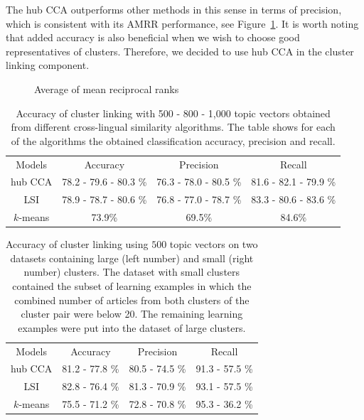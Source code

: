 \documentclass[twoside,11pt]{article}
\begin{document}
 The hub CCA outperforms other methods in this sense in terms of precision, which is consistent with its AMRR performance, see Figure~\ref{pic:AMRR}.
It is worth noting that added accuracy is also beneficial when we wish to choose good representatives of clusters. Therefore, we decided to use hub CCA in the cluster linking component.

\begin{figure}
\centering

\caption{Average of mean reciprocal ranks}
\label{pic:AMRR}
\end{figure}

\begin{table}[h]
\caption{Accuracy of cluster linking with 500 - 800 - 1,000 topic vectors obtained from different cross-lingual similarity algorithms. The table shows for each of the algorithms the obtained classification accuracy, precision and recall.}
\label{table:linkingEvalAlgos}
\begin{center}
\begin{tabular}{|c|c|c|c|}
  \hline
  \cline{1-4}
  Models & Accuracy & Precision & Recall \\ \cline{1-4}
  hub CCA      & 78.2 - 79.6 - 80.3 \% & 76.3 - 78.0 - 80.5 \%  & 81.6 - 82.1 - 79.9 \%  \\ \cline{1-4}
  LSI      & 78.9 - 78.7 - 80.6 \%  & 76.8 - 77.0 - 78.7 \%  & 83.3 - 80.6 - 83.6 \%  \\ \cline{1-4}
 $k$-means & 73.9\phantom{ - 78.7 - 80.6 }\% & 69.5\phantom{ - 78.7 - 80.6 }\%  & 84.6\phantom{ - 78.7 - 80.6 }\%  \\ \cline{1-4}
\end{tabular}
\end{center}
\end{table}

\begin{table}[h]
\caption{Accuracy of cluster linking using $500$ topic vectors on two datasets containing large (left number) and small (right number) clusters. The dataset with small clusters contained the subset of learning examples in which the combined number of articles from both clusters of the cluster pair were below 20. The remaining learning examples were put into the dataset of large clusters.}
\label{table:linkingEvalAlgosLargeSmall}
\begin{center}
\begin{tabular}{|c|c|c|c|}
  \hline
  \cline{1-4}
  Models & Accuracy & Precision & Recall \\ \cline{1-4}
  hub CCA      & 81.2 - 77.8 \% & 80.5 - 74.5 \%  & 91.3 - 57.5 \%  \\ \cline{1-4}
  LSI      & 82.8 - 76.4 \% & 81.3 - 70.9 \%  & 93.1 - 57.5 \%  \\ \cline{1-4}
 $k$-means & 75.5 - 71.2 \% & 72.8 - 70.8 \%  & 95.3 - 36.2 \%  \\ \cline{1-4}
\end{tabular}
\end{center}
\end{table}
\end{document}
